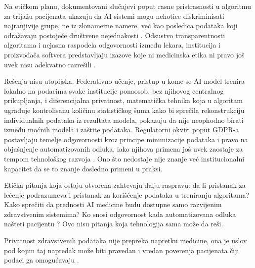 \documentclass[12pt]{article}
\begin{document}
Na etičkom planu, dokumentovani slučajevi poput rasne pristrasnosti u 
algoritmu za trijažu pacijenata ukazuju da AI sistemi mogu nehotice 
diskriminisati najranjivije grupe, ne iz zlonamerne namere, već kao 
posledica podataka koji odražavaju postojeće društvene nejednakosti 
\cite{obermeyer2019}. Odsustvo transparentnosti algoritama i nejasna 
raspodela odgovornosti između lekara, institucija i proizvođača softvera 
predstavljaju izazove koje ni medicinska etika ni pravo još uvek nisu 
adekvatno razrešili \cite{kumar2025}.
 
Rešenja nisu utopijska. Federativno učenje, pristup u kome se AI model 
trenira lokalno na podacima svake institucije ponaosob, bez njihovog 
centralnog prikupljanja, i diferencijalna privatnost, matematička 
tehnika koja u algoritam ugrađuje kontrolisanu količinu statističkog šuma 
kako bi sprečila rekonstrukciju individualnih podataka iz rezultata modela, pokazuju da nije neophodno birati između moćnih modela i zaštite podataka. Regulatorni okviri poput GDPR-a postavljaju temelje 
odgovornosti kroz principe minimizacije podataka i pravo na objašnjenje 
automatizovanih odluka, iako njihova primena još uvek zaostaje za tempom 
tehnološkog razvoja \cite{gdpr2016}. Ono što nedostaje nije znanje već institucionalni kapacitet da se to znanje dosledno primeni u praksi.
 
Etička pitanja koja ostaju otvorena zahtevaju dalju raspravu: da li pristanak za lečenje podrazumeva i pristanak za korišćenje podataka u treniranju algoritama? Kako sprečiti da prednosti AI medicine budu dostupne samo razvijenim zdravstvenim sistemima? Ko snosi odgovornost kada automatizovana odluka našteti pacijentu \cite{murdoch2021}? Ovo nisu pitanja koja tehnologija sama može da reši.
 
Privatnost zdravstvenih podataka nije prepreka napretku medicine, ona je 
uslov pod kojim taj napredak može biti pravedan i vredan poverenja pacijenata čiji podaci ga omogućavaju \cite{kumar2025}.
 
\newpage
\renewcommand{\refname}{Literatura}
 
\end{document}
